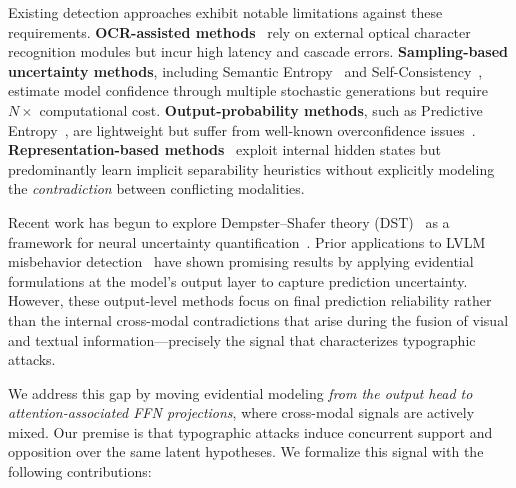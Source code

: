 \documentclass[preprint,12pt]{elsarticle}
\begin{document}
Existing detection approaches exhibit notable limitations against these requirements. \textbf{OCR-assisted methods}~\cite{nagaraja2025image} rely on external optical character recognition modules but incur high latency and cascade errors. \textbf{Sampling-based uncertainty methods}, including Semantic Entropy~\cite{farquhar2024detecting} and Self-Consistency~\cite{wang2022self}, estimate model confidence through multiple stochastic generations but require $N\times$ computational cost. \textbf{Output-probability methods}, such as Predictive Entropy~\cite{kadavath2022language,malinin2020uncertainty}, are lightweight but suffer from well-known overconfidence issues~\cite{guo2017calibration}. \textbf{Representation-based methods}~\cite{jiang2025hiddendetect,kirch2025features} exploit internal hidden states but predominantly learn implicit separability heuristics without explicitly modeling the \emph{contradiction} between conflicting modalities.

Recent work has begun to explore Dempster--Shafer theory (DST)~\cite{shafer1976theory,dempster1967upper} as a framework for neural uncertainty quantification~\cite{denoeux2019logistic,sensoy2018evidential}. Prior applications to LVLM misbehavior detection~\cite{huang2025visual,huang2026detecting} have shown promising results by applying evidential formulations at the model's output layer to capture prediction uncertainty. However, these output-level methods focus on final prediction reliability rather than the internal cross-modal contradictions that arise during the fusion of visual and textual information---precisely the signal that characterizes typographic attacks.

We address this gap by moving evidential modeling \emph{from the output head to attention-associated FFN projections}, where cross-modal signals are actively mixed. Our premise is that typographic attacks induce concurrent support and opposition over the same latent hypotheses. We formalize this signal with the following contributions:
\end{document}
